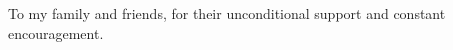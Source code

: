 \dedicatory
To my family and friends, for their unconditional support and constant encouragement.
\enddedicatory